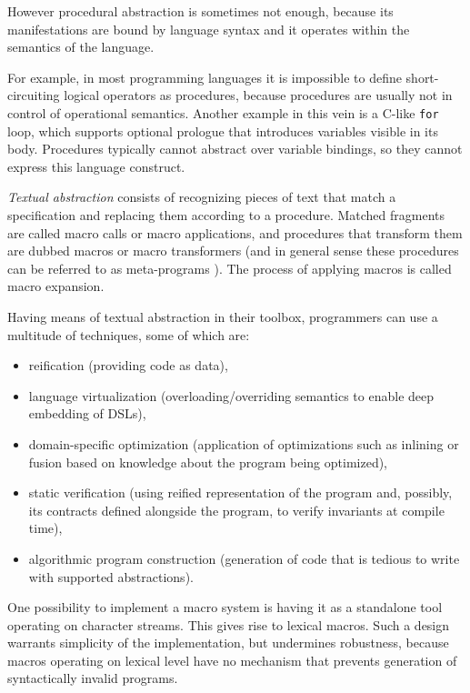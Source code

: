 \documentclass[10pt,journal,a4paper]{IEEEtran}
\begin{document}
However procedural abstraction is sometimes not enough, because
its manifestations are bound by language syntax and it operates within the semantics
of the language.

For example, in most programming languages it is impossible to define short-circuiting logical operators
as procedures, because procedures are usually not in control of operational semantics.
Another example in this vein is a C-like \small \texttt{for} \normalsize loop, which supports
optional prologue that introduces variables visible in its body. Procedures typically cannot abstract
over variable bindings, so they cannot express this language construct.


\emph{Textual abstraction} consists of recognizing pieces of text
that match a specification and replacing them according
to a procedure.
Matched fragments are called macro calls or macro applications, and
procedures that transform them are dubbed macros or macro transformers \cite{kohlbecker86}
(and in general sense these procedures can be referred to as meta-programs \cite{sheard01}).
The process of applying macros is called macro expansion.

Having means of textual abstraction in their toolbox, programmers can use a multitude of techniques,
some of which are:
\begin{itemize}
\item reification (providing code as data),
\item language virtualization (overloading/overriding semantics
to enable deep embedding of DSLs),
\item domain-specific optimization (application of optimizations such as inlining
or fusion based on knowledge about the program being optimized),
\item static verification (using reified representation of the program
and, possibly, its contracts defined alongside the program, to verify invariants
at compile time),
\item algorithmic program construction (generation of code that is tedious to write with
supported abstractions).
\end{itemize}

One possibility to implement a macro system is having it as a standalone tool
operating on character streams. This gives rise to lexical macros.
Such a design warrants simplicity of the implementation,
but undermines robustness, because macros operating on lexical level
have no mechanism that prevents generation of syntactically invalid programs.
\end{document}
